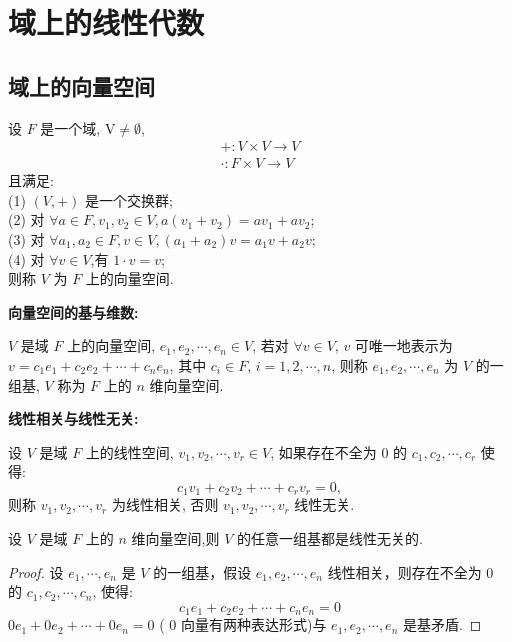 \section{域上的线性代数}
\subsection{域上的向量空间}
\begin{definition}
    设 $ F $ 是一个域, $ \mathrm{V} \neq \emptyset $,
$$
\begin{array}{c}
+: V \times V \rightarrow V \\
\cdot: F \times V \rightarrow V
\end{array}
$$
且满足:\\
(1) $ (V,+) $ 是一个交换群;\\
(2) 对 $ \forall a \in F, v_{1}, v_{2} \in V, a\left(v_{1}+v_{2}\right)=a v_{1}+a v_{2} $;\\
(3) 对 $ \forall a_{1}, a_{2} \in F, v \in V,\left(a_{1}+a_{2}\right) v=a_{1} v+a_{2} v $;\\
(4) 对 $ \forall v \in V $,有 $ 1 \cdot v=v $;\\
则称 $ V $ 为 $ F $ 上的向量空间.
\end{definition}

\textbf{ 向量空间的基与维数:}

$ V $ 是域 $ F $ 上的向量空间, $ e_{1}, e_{2}, \cdots, e_{n} \in V $, 若对 $ \forall v \in V $, $ v $ 可唯一地表示为 $ v=c_{1} e_{1}+c_{2} e_{2}+\cdots+c_{n} e_{n} $, 其中 $ c_{i} \in F $, $ i=1,2, \cdots, n $, 则称 $ e_{1}, e_{2}, \cdots, e_{n} $ 为 $ V $ 的一组基, $ V $ 称为 $ F $ 上的 $ n $ 维向量空间.

\textbf{ 线性相关与线性无关:}

设 $ V $ 是域 $ F $ 上的线性空间, $ v_{1}, v_{2}, \cdots, v_{r} \in V $, 如果存在不全为 0 的 $ c_{1}, c_{2}, \cdots, c_{r} $ 使得:
$$
c_{1} v_{1}+c_{2} v_{2}+\cdots+c_{r} v_{r}=0,
$$
则称 $ v_{1}, v_{2}, \cdots, v_{r} $ 为线性相关, 否则 $ v_{1}, v_{2}, \cdots, v_{r} $ 线性无关.
\begin{theorem}
    设 $ V $ 是域 $ F $ 上的 $ n $ 维向量空间,则 $ V $ 的任意一组基都是线性无关的.
\end{theorem}
\begin{proof}
    设 $ e_{1}, \cdots, e_{n} $ 是 $ V $ 的一组基，假设 $ e_{1}, e_{2}, \cdots, e_{n} $ 线性相关，则存在不全为 0 的 $ c_{1}, c_{2}, \cdots, c_{n} $, 使得:
$$
c_{1} e_{1}+c_{2} e_{2}+\cdots+c_{n} e_{n}=0
$$
$ 0 e_{1}+0 e_{2}+\cdots+0 e_{n}=0 $ ( 0 向量有两种表达形式)与 $ e_{1}, e_{2}, \cdots, e_{n} $ 是基矛盾.
\end{proof}

